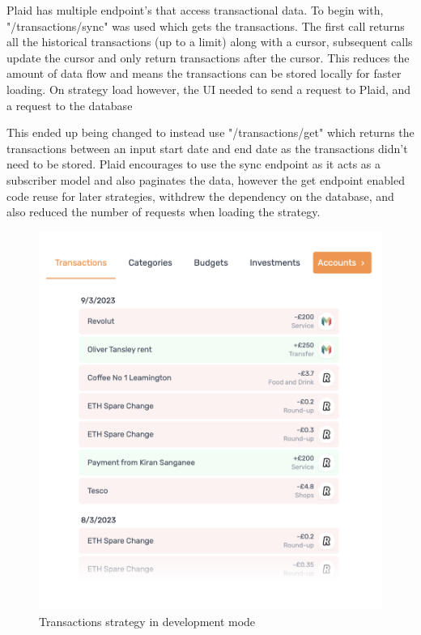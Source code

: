 Plaid has multiple endpoint's that access transactional data. To begin with, "/transactions/sync" was used which gets the transactions. The first call returns all the historical transactions (up to a limit) along with a cursor, subsequent calls update the cursor and only return transactions after the cursor. This reduces the amount of data flow and means the transactions can be stored locally for faster loading. On strategy load however, the UI needed to send a request to Plaid, and a request to the database

This ended up being changed to instead use "/transactions/get" which returns the transactions between an input start date and end date as the transactions didn't need to be stored. Plaid encourages to use the sync endpoint as it acts as a subscriber model and also paginates the data, however the get endpoint enabled code reuse for later strategies, withdrew the dependency on the database, and also reduced the number of requests when loading the strategy.

\begin{figure}[H]
	\centering
	\includegraphics[width=\textwidth]{images/Transactions_development.png}
	\caption{Transactions strategy in development mode}
	\label{fig:TransactionsStrategy}
\end{figure}

